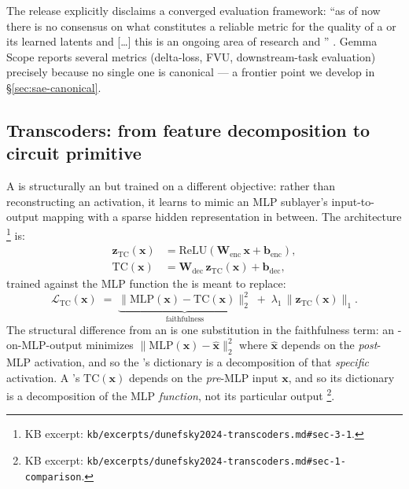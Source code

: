 The release explicitly disclaims a converged evaluation framework:
``as of now there is no consensus on what constitutes a reliable metric
for the quality of a  or its learned latents and
[\dots] this is an ongoing area of research and ''
\citep[\S 4]{gemma-scope-2024}. Gemma Scope reports several metrics
(delta-loss, FVU, downstream-task evaluation) precisely because no
single one is canonical --- a frontier point we develop in
\S\ref{sec:sae-canonical}.

\subsection{Transcoders: from feature decomposition to circuit primitive}
\label{sec:sae-transcoders}

A \emph{} \citep{dunefsky2024-transcoders} is structurally an
 but trained on a different objective: rather than reconstructing an
activation, it learns to mimic an MLP sublayer's input-to-output
mapping with a sparse hidden representation in between. The
architecture
\citep[\S 3.1, Eq.~3--5]{dunefsky2024-transcoders}\footnote{KB excerpt:
\nolinkurl{kb/excerpts/dunefsky2024-transcoders.md#sec-3-1}.} is:
\begin{align}
  \mathbf{z}_{\text{TC}}(\mathbf{x})
  &= \mathrm{ReLU}\!\left(\mathbf{W}_{\text{enc}}\,\mathbf{x} + \mathbf{b}_{\text{enc}}\right),
  \label{eq:transcoder-encoder}\\
  \mathrm{TC}(\mathbf{x})
  &= \mathbf{W}_{\text{dec}}\,\mathbf{z}_{\text{TC}}(\mathbf{x}) + \mathbf{b}_{\text{dec}},
  \label{eq:transcoder-decoder}
\end{align}
trained against the MLP function the  is meant to replace:
\begin{equation}
  \mathcal{L}_{\text{TC}}(\mathbf{x})
  \;=\;
  \underbrace{\|\mathrm{MLP}(\mathbf{x}) - \mathrm{TC}(\mathbf{x})\|_2^2}_{\text{faithfulness}}
  \;+\;
  \lambda_1\,\|\mathbf{z}_{\text{TC}}(\mathbf{x})\|_1.
  \label{eq:transcoder-loss}
\end{equation}
The structural difference from an  is one substitution in the
faithfulness term: an -on-MLP-output minimizes
$\|\mathrm{MLP}(\mathbf{x}) - \hat{\mathbf{x}}\|_2^2$ where
$\hat{\mathbf{x}}$ depends on the \emph{post}-MLP activation, and so
the 's  dictionary is a decomposition of that
\emph{specific} activation. A 's $\mathrm{TC}(\mathbf{x})$
depends on the \emph{pre}-MLP input $\mathbf{x}$, and so its 
dictionary is a decomposition of the MLP \emph{function}, not its
particular output \citep[\S 1]{dunefsky2024-transcoders}\footnote{KB
excerpt: \nolinkurl{kb/excerpts/dunefsky2024-transcoders.md#sec-1-comparison}.}.

